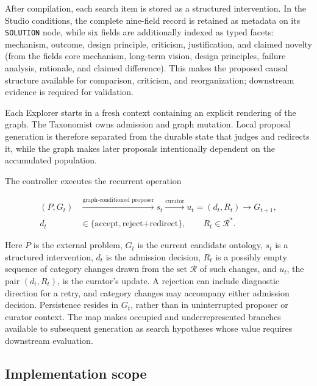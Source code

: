 \documentclass[11pt,a4paper]{article}
\begin{document}
After compilation, each search item is stored as a structured intervention. In the Studio conditions, the complete nine-field record is retained as metadata on its \texttt{SOLUTION} node, while six fields are additionally indexed as typed facets: mechanism, outcome, design principle, criticism, justification, and claimed novelty (from the fields core mechanism, long-term vision, design principles, failure analysis, rationale, and claimed difference). This makes the proposed causal structure available for comparison, criticism, and reorganization; downstream evidence is required for validation.

Each Explorer starts in a fresh context containing an explicit rendering of the graph. The Taxonomist owns admission and graph mutation. Local proposal generation is therefore separated from the durable state that judges and redirects it, while the graph makes later proposals intentionally dependent on the accumulated population.

The controller executes the recurrent operation

\begin{equation}
\begin{aligned}
(P,G_t)&\xrightarrow{\text{graph-conditioned proposer}}s_t
\xrightarrow{\text{curator}}u_t=(d_t,R_t)\longrightarrow G_{t+1},\\
d_t&\in\{\text{accept},\text{reject+redirect}\},
\qquad R_t\in\mathcal{R}^{*}.
\end{aligned}
\label{eq:problem-machine}
\end{equation}

Here $P$ is the external problem, $G_t$ is the current candidate ontology, $s_t$ is a structured intervention, $d_t$ is the admission decision, $R_t$ is a possibly empty sequence of category changes drawn from the set $\mathcal{R}$ of such changes, and $u_t$, the pair $(d_t,R_t)$, is the curator's update. A rejection can include diagnostic direction for a retry, and category changes may accompany either admission decision. Persistence resides in $G_t$, rather than in uninterrupted proposer or curator context. The map makes occupied and underrepresented branches available to subsequent generation as search hypotheses whose value requires downstream evaluation.

\subsection{Implementation scope}
\label{sec:scope}
\end{document}
